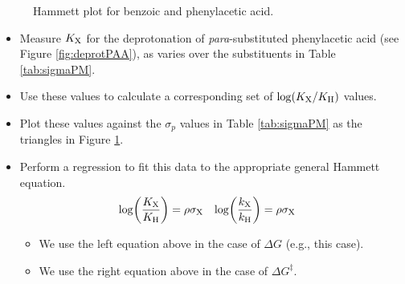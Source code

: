 \documentclass[../notes.tex]{subfiles}
\begin{document}
\begin{itemize}
\begin{figure}[h!]
        \caption{Hammett plot for benzoic and phenylacetic acid.}
        \label{fig:HammettPAA}
    \end{figure}
    \begin{itemize}
        \item Measure $K_{\ce{X}}$ for the deprotonation of \emph{para}-substituted phenylacetic acid (see Figure \ref{fig:deprotPAA}), as  varies over the substituents in Table \ref{tab:sigmaPM}.
        \item Use these values to calculate a corresponding set of $\log(K_{\ce{X}}/K_{\ce{H}})$ values.
        \item Plot these values against the $\sigma_p$ values in Table \ref{tab:sigmaPM} as the triangles in Figure \ref{fig:HammettPAA}.
        \item Perform a regression to fit this data to the appropriate general Hammett equation.
        \begin{align*}
            \log(\frac{K_{\ce{X}}}{K_{\ce{H}}}) &= \rho\sigma_{\ce{X}}&
            \log(\frac{k_{\ce{X}}}{k_{\ce{H}}}) &= \rho\sigma_{\ce{X}}
        \end{align*}
        \begin{itemize}
            \item We use the left equation above in the case of $\Delta G$ (e.g., this case).
            \item We use the right equation above in the case of $\Delta G^\ddagger$.

\end{itemize}
\end{itemize}
\end{itemize}
\end{document}
